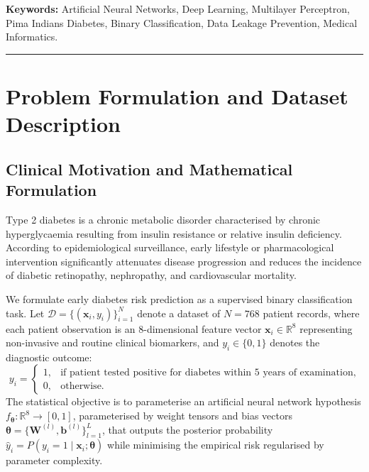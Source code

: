 \documentclass[11pt,a4paper]{article}
\begin{document}
\vspace{0.5em}
\noindent\textbf{Keywords:} Artificial Neural Networks, Deep Learning, Multilayer Perceptron, Pima Indians Diabetes, Binary Classification, Data Leakage Prevention, Medical Informatics.

\vspace{1em}
\hrule
\vspace{1.2em}

\section{Problem Formulation and Dataset Description}
\label{sec:problem_formulation}

\subsection{Clinical Motivation and Mathematical Formulation}
Type 2 diabetes is a chronic metabolic disorder characterised by chronic hyperglycaemia resulting from insulin resistance or relative insulin deficiency. According to epidemiological surveillance, early lifestyle or pharmacological intervention significantly attenuates disease progression and reduces the incidence of diabetic retinopathy, nephropathy, and cardiovascular mortality. 

We formulate early diabetes risk prediction as a supervised binary classification task. Let $\mathcal{D} = \{(\mathbf{x}_i, y_i)\}_{i=1}^N$ denote a dataset of $N=768$ patient records, where each patient observation is an 8-dimensional feature vector $\mathbf{x}_i \in \mathbb{R}^8$ representing non-invasive and routine clinical biomarkers, and $y_i \in \{0, 1\}$ denotes the diagnostic outcome:
\begin{equation}
    y_i = \begin{cases} 
        1, & \text{if patient tested positive for diabetes within 5 years of examination,} \\ 
        0, & \text{otherwise.} 
    \end{cases}
\end{equation}
The statistical objective is to parameterise an artificial neural network hypothesis $f_{\boldsymbol{\theta}}: \mathbb{R}^8 \to [0, 1]$, parameterised by weight tensors and bias vectors $\boldsymbol{\theta} = \{\mathbf{W}^{(l)}, \mathbf{b}^{(l)}\}_{l=1}^L$, that outputs the posterior probability $\hat{y}_i = P(y_i = 1 \mid \mathbf{x}_i; \boldsymbol{\theta})$ while minimising the empirical risk regularised by parameter complexity.
\end{document}
